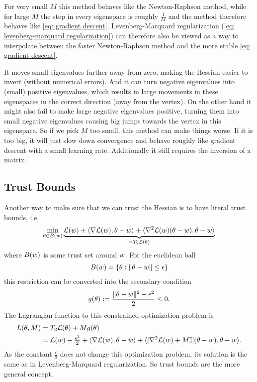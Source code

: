 For very small \(M\) this method behaves like the Newton-Raphson method, while
for large \(M\) the step in every eigenspace is roughly \(\tfrac1M\) and the
method therefore behaves like \ref{eq: gradient descent}. Levenberg-Marquard
regularization (\ref{eq: levenberg-marquard regularization}) can therefore also
be viewed as a way to interpolate between the faster Newton-Raphson method and
the more stable \ref{eq: gradient descent}. 

It moves small eigenvalues further away from zero, making the Hessian easier to
invert (without numerical errors). And it can turn negative eigenvalues into
(small) positive eigenvalues, which results in large movements in these
eigenspaces in the correct direction (away from the vertex). On the other hand
it might also fail to make large negative eigenvalues positive, turning them into
small negative eigenvalues causing big jumps towards the vertex in this
eigenspace. So if we pick \(M\) too small, this method can make things worse.
If it is too big, it will just slow down convergence and behave roughly like
gradient descent with a small learning rate. Additionally it still requires the
inversion of a matrix.

\subsection{Trust Bounds}

Another way to make sure that we can trust the Hessian is to have literal trust
bounds, i.e.
\begin{align*}
	\min_{ \theta\in B(w) }
	\underbrace{
		\mathcal{L}(w)
		+ \langle \nabla\mathcal{L}(w), \theta-w\rangle
		+ \langle \nabla^2\mathcal{L}(w)(\theta-w), \theta-w\rangle
	}_{= T_2\mathcal{L}(\theta)}
\end{align*}
where \(B(w)\) is some trust set around \(w\). For the euclidean
ball
\begin{align*}
	B(w) = \{ \theta : \|\theta - w\| \le \epsilon\}
\end{align*}
this restriction can be converted into the secondary condition
\begin{align*}
	g(\theta) := \frac{\|\theta - w\|^2 - \epsilon^2}{2} \le 0.
\end{align*}
The Lagrangian function to this constrained optimization problem is
\begin{align*}
	L(\theta, M) 
	&= T_2\mathcal{L}(\theta) + M g(\theta)\\
	&= \mathcal{L}(w) -\tfrac{\epsilon^2}{2}
	+ \langle \nabla\mathcal{L}(w), \theta-w\rangle
	+ \langle [\nabla^2\mathcal{L}(w) + M\mathbb{I}](\theta-w), \theta-w\rangle.
\end{align*}
As the constant \(\frac{\epsilon}2\) does not change this optimization problem,
its solution is the same as in Levenberg-Marquard regularization. So trust
bounds are the more general concept.

